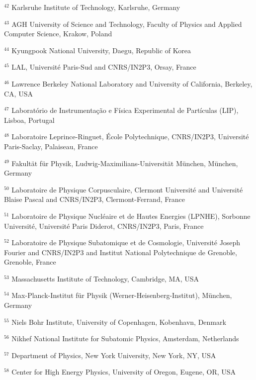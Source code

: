 \par {\footnotesize $^{42}$ Karlsruhe Institute of Technology, Karlsruhe, Germany}
\par {\footnotesize $^{43}$ AGH University of Science and Technology, Faculty of Physics and Applied Computer Science, Krakow, Poland}
\par {\footnotesize $^{44}$ Kyungpook National University, Daegu, Republic of Korea}
\par {\footnotesize $^{45}$ LAL, Université Paris-Sud and CNRS/IN2P3, Orsay, France}
\par {\footnotesize $^{46}$ Lawrence Berkeley National Laboratory and University of California, Berkeley, CA, USA}
\par {\footnotesize $^{47}$ Laboratório de Instrumentação e Física Experimental de Partículas (LIP), Lisboa, Portugal}
\par {\footnotesize $^{48}$ Laboratoire Leprince-Ringuet, École Polytechnique, CNRS/IN2P3, Université Paris-Saclay, Palaiseau, France}
\par {\footnotesize $^{49}$ Fakultät für Physik, Ludwig-Maximilians-Universität München, München, Germany}
\par {\footnotesize $^{50}$ Laboratoire de Physique Corpusculaire, Clermont Université and Université Blaise Pascal and CNRS/IN2P3, Clermont-Ferrand, France}
\par {\footnotesize $^{51}$ Laboratoire de Physique Nucléaire et de Hautes Energies (LPNHE), Sorbonne Université, Université Paris Diderot, CNRS/IN2P3, Paris, France}
\par {\footnotesize $^{52}$ Laboratoire de Physique Subatomique et de Cosmologie, Université Joseph Fourier and CNRS/IN2P3 and Institut National Polytechnique de Grenoble, Grenoble, France}
\par {\footnotesize $^{53}$ Massachusetts Institute of Technology, Cambridge, MA, USA}
\par {\footnotesize $^{54}$ Max-Planck-Institut für Physik (Werner-Heisenberg-Institut), München, Germany}
\par {\footnotesize $^{55}$ Niels Bohr Institute, University of Copenhagen, Kobenhavn, Denmark}
\par {\footnotesize $^{56}$ Nikhef National Institute for Subatomic Physics, Amsterdam, Netherlands}
\par {\footnotesize $^{57}$ Department of Physics, New York University, New York, NY, USA}
\par {\footnotesize $^{58}$ Center for High Energy Physics, University of Oregon, Eugene, OR, USA}
